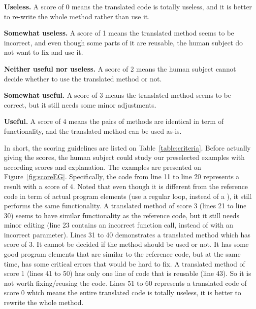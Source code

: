 \begin{compactitem}

\item {\bf Useless.} A score of 0 means the translated code is totally useless, and
  it is better to re-write the whole method rather than use it.

\item {\bf Somewhat useless.} A score of 1 means the translated method
  seems to be incorrect, and even though some parts of it are
  reusable, the human subject do not want to fix and use it.

\item {\bf Neither useful nor useless.} A score of 2 means the human
  subject cannot decide whether to use the translated method or not.

\item {\bf Somewhat useful.} A score of 3 means the translated method
  seems to be correct, but it still needs some minor adjustments.

\item {\bf Useful.} A score of 4 means the pairs of methods are
  identical in term of functionality, and the translated method can be
  used as-is.

\end{compactitem}

In short, the scoring guidelines are listed on
Table~\ref{table:criteria}. Before actually giving the scores, the
human subject could study our preselected examples with according
scores and explanation. The examples are presented on
Figure~\ref{fig:scoreEG}. Specifically, the code from line 11 to line
20 represents a result with a score of 4. Noted that even though it is
different from the reference code in term of actual program elements
(use a regular  loop, instead of a ), it still
performs the same functionality. A translated method of score 3 (lines
21 to line 30) seems to have similar functionality as the reference
code, but it still needs minor editing (line 23 contains an incorrect
function call,  instead of  with an
incorrect parameter). Lines 31 to 40 demonstrates a translated method
which has score of 3. It cannot be decided if the method should be
used or not. It has some good program elements that are similar to the
reference code, but at the same time, has some critical errors that
would be hard to fix. A translated method of score 1 (lines 41 to 50)
has only one line of code that is reusable (line 43). So it is not
worth fixing/reusing the code. Lines 51 to 60 represents a translated
code of score 0 which means the entire translated code is totally
useless, \ie it is better to rewrite the whole method.

